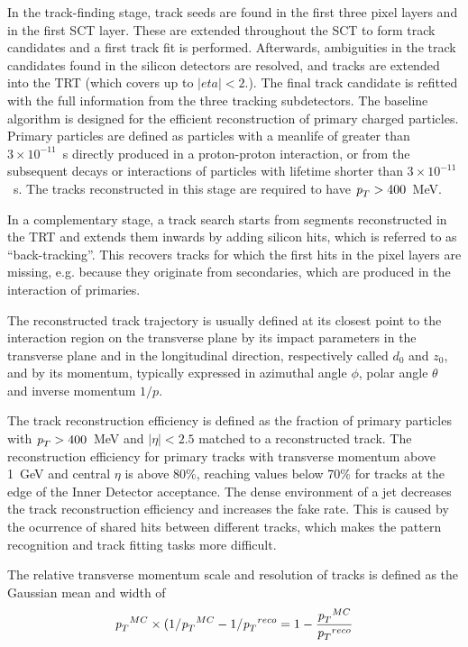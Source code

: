 \begin{itemize}
\begin{itemize}
In the track-finding stage, track seeds are found in the first three pixel layers and in the first SCT layer. These are extended throughout the SCT to form track candidates and a first track fit is performed. Afterwards, ambiguities in the track candidates found in the silicon detectors are resolved, and tracks are extended into the TRT (which covers up to $|eta|<2.$). The final track candidate is refitted with the full information from the three tracking subdetectors. The baseline algorithm is designed for the efficient reconstruction of primary charged particles. Primary particles are defined as particles with a meanlife of greater than $3 \times 10^{-11}$~s directly produced in a proton-proton interaction, or from the subsequent decays or interactions of particles with lifetime shorter than $3 \times 10^{-11}$~s. The tracks reconstructed in this stage are required to have ${\emph{p}_{T}}> 400$~MeV.

In a complementary stage, a track search starts from segments reconstructed in the TRT and extends them inwards by adding silicon hits, which is referred to as ``back-tracking''. This recovers tracks for which the first hits in the pixel layers are missing, e.g. because they originate from secondaries, which are produced in the interaction of primaries.

The reconstructed track trajectory is usually defined at its closest point to the interaction region on the transverse plane by its impact parameters in the transverse plane and in the longitudinal direction, respectively called $d_0$ and $z_0$, and by its momentum, typically expressed in azimuthal angle $\phi$, polar angle $\theta$ and inverse momentum $1/p$. 

 The track reconstruction efficiency is defined as the fraction of primary particles with ${\emph{p}_{T}}> 400$~MeV and $|\eta|<2.5$ matched to a reconstructed track. The reconstruction efficiency for primary tracks with transverse momentum above 1~GeV and central $\eta$ is above 80\%, reaching values below 70\% for tracks at the edge of the Inner Detector acceptance. %
The dense environment of a jet decreases the track reconstruction efficiency and increases the fake rate. This is caused by the ocurrence of shared hits between different tracks, which makes the pattern recognition and track fitting tasks more difficult.

The relative transverse momentum scale and resolution of tracks is defined as the Gaussian mean and width of
%
\begin{equation}
{\emph{p}_{T}}^{MC} \times (1/{\emph{p}_{T}}^{MC}  - 1/{\emph{p}_{T}}^{reco} = 1 - \frac{{\emph{p}_{T}}^{MC}}{{\emph{p}_{T}}^{reco}}
\end{equation}


\end{itemize}
\end{itemize}
